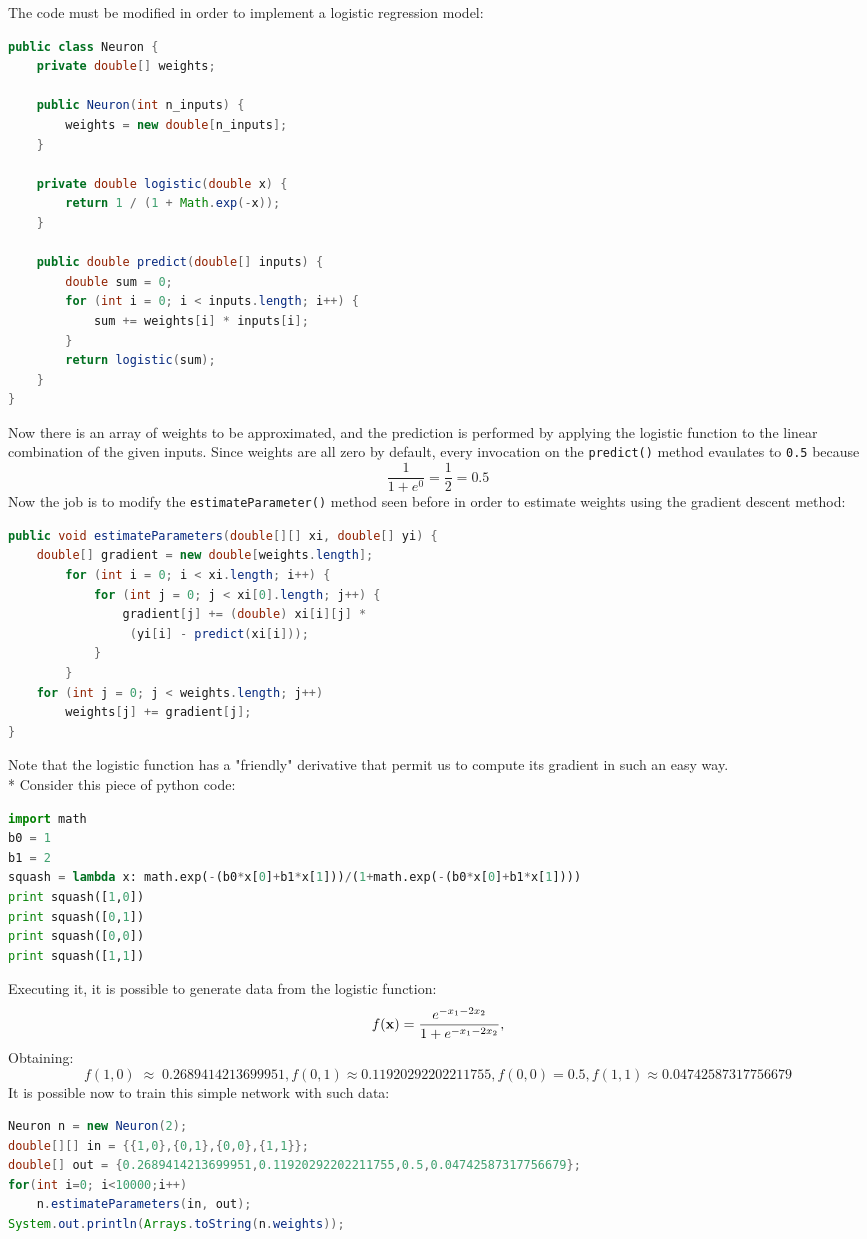 \documentclass[10pt,a4paper]{article}
\begin{document}
The code must be modified in order to implement a logistic regression model:
\begin{lstlisting}[language=Java]
public class Neuron {
	private double[] weights;
	
	public Neuron(int n_inputs) {
		weights = new double[n_inputs];
	}
	
	private double logistic(double x) {
		return 1 / (1 + Math.exp(-x));
	}
	
	public double predict(double[] inputs) {
		double sum = 0;
		for (int i = 0; i < inputs.length; i++) {
			sum += weights[i] * inputs[i];
		}
		return logistic(sum);
	}
}
\end{lstlisting}
Now there is an array of weights to be approximated, and the prediction is performed by applying the logistic function to the linear combination of the given inputs. Since weights are all zero by default, every invocation on the \texttt{predict()} method evaulates to \texttt{0.5} because
$$
\frac{1}{1+e^{0}} = \frac{1}{2} = 0.5
$$
Now the job is to modify the \texttt{estimateParameter()} method seen before in order to estimate weights using the gradient descent method:
\begin{lstlisting}[language=Java]
public void estimateParameters(double[][] xi, double[] yi) {
	double[] gradient = new double[weights.length];
		for (int i = 0; i < xi.length; i++) {
			for (int j = 0; j < xi[0].length; j++) {
				gradient[j] += (double) xi[i][j] *
				 (yi[i] - predict(xi[i]));
			}
		}
	for (int j = 0; j < weights.length; j++)
		weights[j] += gradient[j];
}
\end{lstlisting}
Note that the logistic function has a "friendly" derivative that permit us to compute its gradient in such an easy way.\\*
Consider this piece of python code:
\begin{lstlisting}[language=Python]
import math
b0 = 1
b1 = 2
squash = lambda x: math.exp(-(b0*x[0]+b1*x[1]))/(1+math.exp(-(b0*x[0]+b1*x[1])))
print squash([1,0])
print squash([0,1])
print squash([0,0])
print squash([1,1])
\end{lstlisting}
Executing it, it is possible to generate data from the logistic function:
$$
f(\textbf x) = \frac{e^{-x_1-2x_2}}{1+e^{-x_1-2x_2}},
$$
Obtaining:
$$
f(1,0) \;\approx\;0.2689414213699951, f(0,1) \approx 0.11920292202211755, f(0,0) = 0.5, f(1,1) \approx 0.04742587317756679
$$
It is possible now to train this simple network with such data:
\begin{lstlisting}[language=Java]
Neuron n = new Neuron(2);
double[][] in = {{1,0},{0,1},{0,0},{1,1}};
double[] out = {0.2689414213699951,0.11920292202211755,0.5,0.04742587317756679};
for(int i=0; i<10000;i++)
	n.estimateParameters(in, out);
System.out.println(Arrays.toString(n.weights));
\end{lstlisting}
\end{document}
